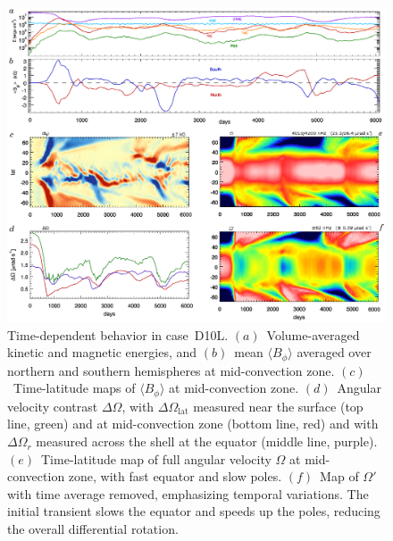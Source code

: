 \begin{figure}
  \includegraphics[width=\linewidth]{figs/chapter_8/time_history_mmc_vturf_10_LC.eps}
  \caption[Time-dependent behavior in case~D10L]
	  {Time-dependent behavior in case~D10L.  
          $(a)$~Volume-averaged kinetic and magnetic energies, and 
	  $(b)$~mean $\langle B_\phi \rangle$ averaged over northern
	  and southern hemispheres at mid-convection zone.
	  $(c)$~Time-latitude maps of $\langle B_\phi \rangle$ at
	  mid-convection zone.
          $(d)$~Angular velocity contrast $\Delta \Omega$, with
          $\Delta \Omega_\mathrm{lat}$ measured near the surface (top
          line, green) and at mid-convection zone (bottom line, red)
          and with $\Delta \Omega_r$ measured across the shell at the
          equator (middle line, purple). 
	  $(e)$~Time-latitude map of full angular velocity $\Omega$ at
          mid-convection zone, with fast equator and slow poles.
	  $(f)$~Map of $\Omega'$ with time average removed,
          emphasizing temporal variations.  The initial transient
          slows the equator and speeds up the poles, reducing the
          overall differential rotation.
          \label{fig:D10L}}
\end{figure}


